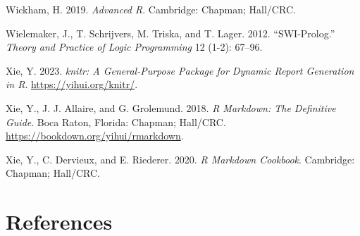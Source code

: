 Wickham, H. 2019. \emph{Advanced R}. Cambridge: Chapman; Hall/CRC.

Wielemaker, J., T. Schrijvers, M. Triska, and T. Lager. 2012.
``SWI-Prolog.'' \emph{Theory and Practice of Logic Programming} 12 (1-2):
67--96.

Xie, Y. 2023. \emph{knitr: A General-Purpose Package for Dynamic Report
Generation in R}. \url{https://yihui.org/knitr/}.

Xie, Y., J. J. Allaire, and G. Grolemund. 2018. \emph{R Markdown: The
Definitive Guide}. Boca Raton, Florida: Chapman; Hall/CRC.
\url{https://bookdown.org/yihui/rmarkdown}.

Xie, Y., C. Dervieux, and E. Riederer. 2020. \emph{R Markdown Cookbook}.
Cambridge: Chapman; Hall/CRC.

\hypertarget{references-1}{%
\section{References}\label{references-1}}


\address{%
Matthias Gondan\\
Universität Innsbruck\\%
Department of Psychology\\ Innsbruck, Austria\\ \url{https://www.uibk.ac.at/psychologie/mitarbeiter/gondan-rochon/index.html.en}\\
%
%
\textit{ORCiD: \href{https://orcid.org/0000-0001-9974-0057}{0000-0001-9974-0057}}\\%
\href{mailto:Matthias.Gondan-Rochon@uibk.ac.at}{\nolinkurl{Matthias.Gondan-Rochon@uibk.ac.at}}%
}

\address{%
Irene Alfarone\\
Universität Innsbruck\\%
Department of Psychology\\ Innsbruck, Austria\\ \url{https://www.uibk.ac.at/psychologie/mitarbeiter/alfarone/index.html.en}\\
%
%
\textit{ORCiD: \href{https://orcid.org/0000-0002-8409-8900}{0000-0002-8409-8900}}\\%
\href{mailto:Irene.Alfarone@uibk.ac.at}{\nolinkurl{Irene.Alfarone@uibk.ac.at}}%
}
